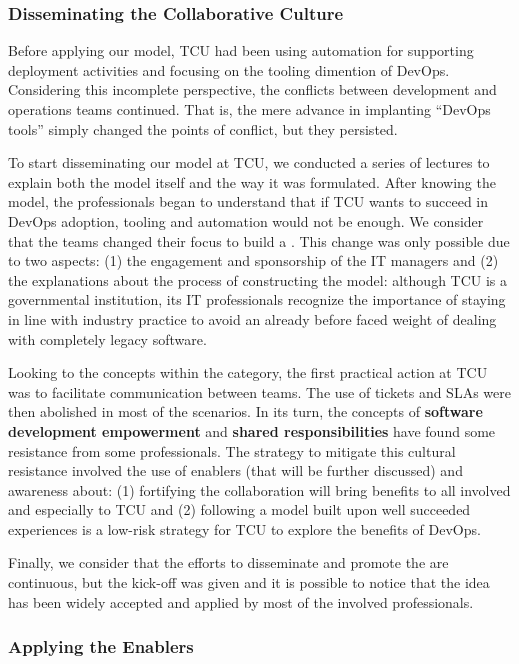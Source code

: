 \subsubsection{Disseminating the Collaborative Culture}

Before applying our model, TCU had been using automation for supporting deployment
activities and focusing on the tooling dimention of DevOps.
Considering this incomplete perspective, the conflicts between
development and operations teams continued. That is, the mere advance in
implanting ``DevOps tools'' simply changed the points of conflict, but they
persisted.

{
\color{blue}
To start disseminating our model at TCU, we conducted a series of lectures to
explain both the model itself and the way it was formulated. After knowing the
model, the professionals began to understand that if TCU wants to succeed in
DevOps adoption, tooling and automation would not be enough. We consider that
the teams changed their focus to build a \cc. This change was only possible due
to two aspects: (1) the engagement and sponsorship of the IT managers and (2) the
explanations about the process of constructing the model: although TCU is a
governmental institution, its IT professionals recognize the importance of
staying in line with industry practice to avoid an already before faced weight
of dealing with completely legacy software.

Looking to the concepts within the \cc category, the first practical action at
TCU was to facilitate communication between teams. The use of tickets and
SLAs were then abolished in most of the scenarios. In its turn, the concepts of
\textbf{software development empowerment} and \textbf{shared responsibilities}
have found some resistance from some professionals. The strategy to mitigate this
cultural resistance involved the use of enablers (that will be further discussed)
and awareness about: (1) fortifying the collaboration will bring benefits
to all involved and especially to TCU and (2) following a model built upon
well succeeded experiences is a low-risk strategy for TCU to explore the
benefits of DevOps.

Finally, we consider that the efforts to disseminate and promote the \cc are
continuous, but the kick-off was given and it is possible to notice that the
idea has been widely accepted and applied by most of the involved professionals.

}

\subsubsection{Applying the Enablers}

